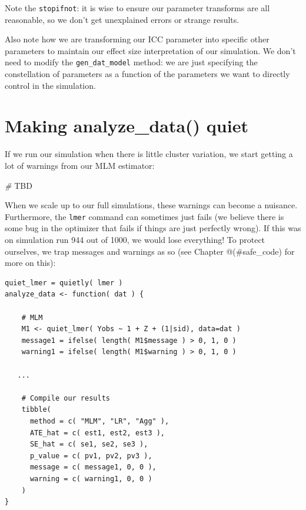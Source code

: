 \documentclass[
]{book}
\newenvironment{Shaded}{\begin{snugshade}}{\end{snugshade}}
\newcommand{\AlertTok}[1]{\textcolor[rgb]{0.94,0.16,0.16}{#1}}
\newcommand{\CommentTok}[1]{\textcolor[rgb]{0.56,0.35,0.01}{\textit{#1}}}
\begin{document}
Note the \texttt{stopifnot}: it is wise to ensure our parameter transforms are all reasonable, so we don't get unexplained errors or strange results.

Also note how we are transforming our ICC parameter into specific other parameters to maintain our effect size interpretation of our
simulation.
We don't need to modify the \texttt{gen\_dat\_model} method: we are just specifying the constellation of parameters as a function of the parameters we want to directly control in the simulation.

\hypertarget{making-analyze_data-quiet}{%
\section{Making analyze\_data() quiet}\label{making-analyze_data-quiet}}

If we run our simulation when there is little cluster variation, we start getting a lot of warnings from our MLM estimator:

\begin{Shaded}
\begin{Highlighting}[]
\CommentTok{\# }\AlertTok{TBD}
\end{Highlighting}
\end{Shaded}

When we scale up to our full simulations, these warnings can become a nuisance.
Furthermore, the \texttt{lmer} command can sometimes just fails (we believe there is some bug in the optimizer that fails if things are just perfectly wrong).
If this was on simulation run 944 out of 1000, we would lose everything!
To protect ourselves, we trap messages and warnings as so (see Chapter @(\#safe\_code) for more on this):

\begin{verbatim}
quiet_lmer = quietly( lmer )
analyze_data <- function( dat ) {
    
    # MLM
    M1 <- quiet_lmer( Yobs ~ 1 + Z + (1|sid), data=dat )
    message1 = ifelse( length( M1$message ) > 0, 1, 0 )
    warning1 = ifelse( length( M1$warning ) > 0, 1, 0 )

   ...

    # Compile our results
    tibble( 
      method = c( "MLM", "LR", "Agg" ),
      ATE_hat = c( est1, est2, est3 ),
      SE_hat = c( se1, se2, se3 ),
      p_value = c( pv1, pv2, pv3 ),
      message = c( message1, 0, 0 ),
      warning = c( warning1, 0, 0 )
    )
}
\end{verbatim}
\end{document}
